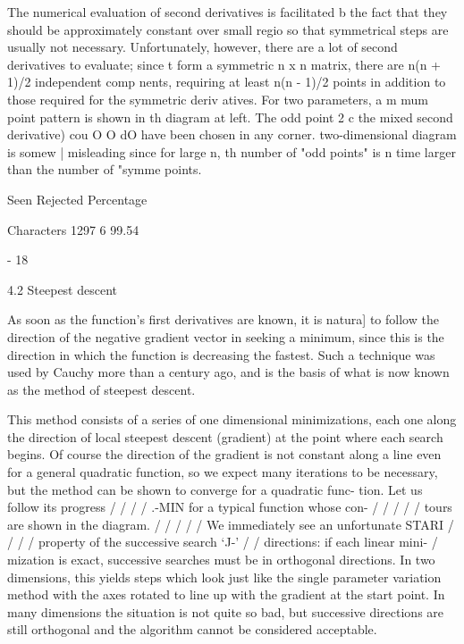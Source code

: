      The numerical evaluation of second derivatives is facilitated b
the fact that they should be approximately constant over small regio
so that symmetrical steps are usually not necessary.  Unfortunately,
however, there are a lot of second derivatives to evaluate;  since t
form a symmetric n x n matrix, there are n(n + 1)/2 independent comp
nents, requiring at least n(n - 1)/2 points  in addition to those
                                    required for the symmetric deriv
                                    atives. For two parameters, a m
                                    mum point pattern is shown in th
                                    diagram at left. The odd point
   2                 c             the mixed second derivative) cou
                 O O dO           have been chosen in any corner.
                                    two-dimensional diagram is somew
                     |              misleading since for large n, th
                                    number of "odd points" is n time
                                    larger than the number of "symme
                                    points.
 
                 Seen Rejected  Percentage
 
Characters       1297        6   99.54
 
                                  - 18
 
 
4.2  Steepest descent
 
     As soon as the function's first derivatives are known, it is natura]
to follow the direction of the negative gradient vector in seeking a
minimum, since this is the direction in which the function is decreasing
the fastest.  Such a technique was used by Cauchy more than a century
ago, and is the basis of what is now known as the method of steepest
descent.
 
     This method consists of a series of one dimensional minimizations,
each one along the direction of local steepest descent (gradient) at the
point where each search begins.  Of course the direction of the gradient
is not constant along a line even for a general quadratic function, so
we expect many iterations to be necessary, but the method can be shown
to converge for a quadratic func-
tion.  Let us follow its progress
                    / / / /  .-MIN  for a typical function whose con-
                        / / /  / /  tours are shown in the diagram.
                        / / /  / /  We immediately see an unfortunate
                   STARI  / / / /  property of the successive search
                        `J-' / /  directions: if each linear mini-
                                  /  mization is exact, successive
                                      searches must be in orthogonal
                                      directions.  In two dimensions,
                                      this yields steps which look just
like the single parameter variation method with the axes rotated to
line up with the gradient at the start point.  In many dimensions the
situation is not quite so bad, but successive directions are still
orthogonal and the algorithm cannot be considered acceptable.
 
